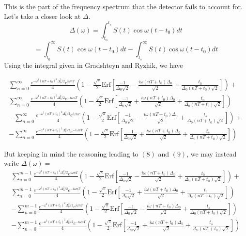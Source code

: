 This is the part of the frequency spectrum that the detector fails to account for. Let's take a closer look at $\Delta$. \[\Delta(\omega)=\int^{t_s}_{t_0}S(t)\cos\omega(t-t_0)dt\]\[=\int^{\infty}_{t_0}S(t)\cos\omega(t-t_0)dt-\int^{\infty}_{t_s}S(t)\cos\omega(t-t_0)dt\] Using the integral given in Gradshteyn and Ryzhik, we have 

\begin{gather}
\sum^{\infty}_{n=0}\frac{e^{-\omega^2(nT+t_0)^2\Delta^2_0/2}e^{i\omega nT}}{4}\left(1-\frac{\sqrt{\pi}}{2}\text{Erf}\left[\frac{-1}{\Delta_0\sqrt{2}}-\frac{i\omega (nT+t_0)\Delta_0}{\sqrt{2}}+\frac{t_0}{\Delta_0(nT+t_0)\sqrt{2}}\right]\right)+ \nonumber \\
\sum^{\infty}_{n=0}\frac{e^{-\omega^2(nT+t_0)^2\Delta^2_0/2}e^{-i\omega nT}}{4}\left(1-\frac{\sqrt{\pi}}{2}\text{Erf}\left[\frac{-1}{\Delta_0\sqrt{2}}+\frac{i\omega (nT+t_0)\Delta_0}{\sqrt{2}}+\frac{t_0}{\Delta_0(nT+t_0)\sqrt{2}}\right]\right) \nonumber \\
-\sum^{\infty}_{n=0}\frac{e^{-\omega^2(nT+t_0)^2\Delta^2_0/2}e^{i\omega nT}}{4}\left(1-\frac{\sqrt{\pi}}{2}\text{Erf}\left[\frac{-1}{\Delta_0\sqrt{2}}-\frac{i\omega (nT+t_0)\Delta_0}{\sqrt{2}}+\frac{t_s}{\Delta_0(nT+t_0)\sqrt{2}}\right]\right)+ \nonumber \\
-\sum^{\infty}_{n=0}\frac{e^{-\omega^2(nT+t_0)^2\Delta^2_0/2}e^{-i\omega nT}}{4}\left(1-\frac{\sqrt{\pi}}{2}\text{Erf}\left[\frac{-1}{\Delta_0\sqrt{2}}+\frac{i\omega (nT+t_0)\Delta_0}{\sqrt{2}}+\frac{t_s}{\Delta_0(nT+t_0)\sqrt{2}}\right]\right)
\end{gather}

But keeping in mind the reasoning leading to $(8)$ and $(9)$, we may instead write $\Delta(\omega)=$
\begin{gather}
\sum^{m-1}_{n=0}\frac{e^{-\omega^2(nT+t_0)^2\Delta^2_0/2}e^{i\omega nT}}{4}\left(1-\frac{\sqrt{\pi}}{2}\text{Erf}\left[\frac{-1}{\Delta_0\sqrt{2}}-\frac{i\omega (nT+t_0)\Delta_0}{\sqrt{2}}+\frac{t_0}{\Delta_0(nT+t_0)\sqrt{2}}\right]\right)\nonumber+\\ 
\sum^{m-1}_{n=0}\frac{e^{-\omega^2(nT+t_0)^2\Delta^2_0/2}e^{-i\omega nT}}{4}\left(1-\frac{\sqrt{\pi}}{2}\text{Erf}\left[\frac{-1}{\Delta_0\sqrt{2}}+\frac{i\omega (nT+t_0)\Delta_0}{\sqrt{2}}+\frac{t_0}{\Delta_0(nT+t_0)\sqrt{2}}\right]\right)\nonumber \\
-\sum^{m-1}_{n=0}\frac{e^{-\omega^2(nT+t_0)^2\Delta^2_0/2}e^{i\omega nT}}{4}\left(1-\frac{\sqrt{\pi}}{2}\text{Erf}\left[\frac{-1}{\Delta_0\sqrt{2}}-\frac{i\omega (nT+t_0)\Delta_0}{\sqrt{2}}+\frac{t_s}{\Delta_0(nT+t_0)\sqrt{2}}\right]\right)\nonumber \\ 
-\sum^{m-1}_{n=0}\frac{e^{-\omega^2(nT+t_0)^2\Delta^2_0/2}e^{-i\omega nT}}{4}\left(1-\frac{\sqrt{\pi}}{2}\text{Erf}\left[\frac{-1}{\Delta_0\sqrt{2}}+\frac{i\omega (nT+t_0)\Delta_0}{\sqrt{2}}+\frac{t_s}{\Delta_0(nT+t_0)\sqrt{2}}\right]\right)
\end{gather}

